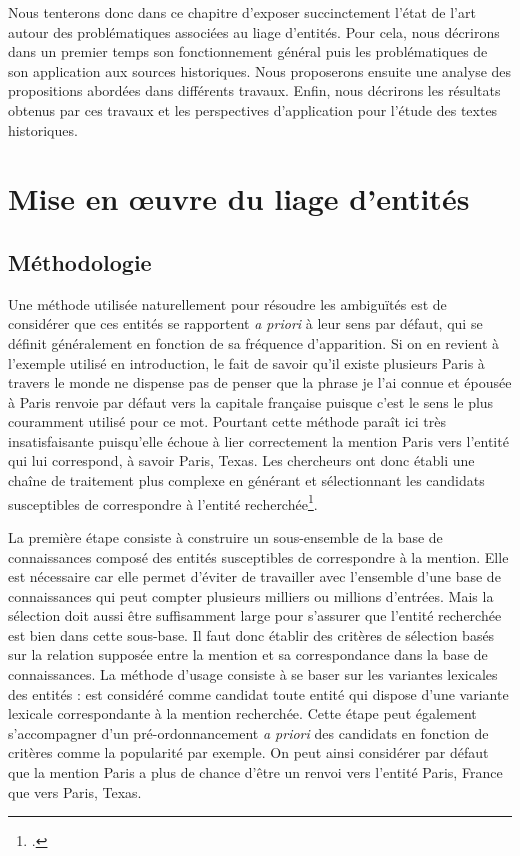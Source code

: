 \documentclass[a4paper,12pt,twoside]{book}
\begin{document}
	Nous tenterons donc dans ce chapitre d'exposer succinctement l'état de l'art autour des  problématiques associées au liage d'entités. Pour cela, nous décrirons dans un premier temps son fonctionnement général puis les problématiques de son application aux sources historiques. Nous proposerons ensuite une analyse des propositions abordées dans différents travaux. Enfin, nous décrirons les résultats obtenus par ces travaux et les perspectives d'application pour l'étude des textes historiques.
	
	
	\section{Mise en œuvre du liage d'entités}
	
	\subsection{Méthodologie}
	
	Une méthode utilisée naturellement pour résoudre les ambiguïtés est de considérer que ces entités se rapportent \textit{a priori} à leur sens par défaut, qui se définit généralement en fonction de sa fréquence d'apparition. Si on en revient à l'exemple utilisé en introduction, le fait de savoir qu'il existe plusieurs \og Paris\fg{} à travers le monde ne dispense pas de penser que la phrase \og je l’ai connue et épousée à Paris\fg{} renvoie par défaut vers la capitale française puisque c'est le sens le plus couramment utilisé pour ce mot. Pourtant cette méthode paraît ici très insatisfaisante puisqu'elle échoue à lier correctement la mention \og Paris\fg{} vers l'entité qui lui correspond, à savoir \og Paris, Texas\fg{}. Les chercheurs ont donc établi une chaîne de traitement plus complexe en générant et sélectionnant les candidats susceptibles de correspondre à l'entité recherchée\footcite[p. 117--125]{stern_identification_2013}.
	
	La première étape consiste à construire un sous-ensemble de la base de connaissances composé des entités susceptibles de correspondre à la mention. Elle est nécessaire car elle permet d'éviter de travailler avec l'ensemble d'une base de connaissances qui peut compter plusieurs milliers ou millions d'entrées. Mais la sélection doit aussi être suffisamment large pour s'assurer que l'entité recherchée est bien dans cette sous-base. Il faut donc établir des critères de sélection basés sur la relation supposée entre la mention et sa correspondance dans la base de connaissances. La méthode d'usage consiste à se baser sur les variantes lexicales des entités : est considéré comme candidat toute entité qui dispose d'une variante lexicale correspondante à la mention recherchée. Cette étape peut également s'accompagner d'un pré-ordonnancement \textit{a priori} des candidats en fonction de critères comme la popularité par exemple. On peut ainsi considérer par défaut que la mention \og Paris\fg{} a plus de chance d'être un renvoi vers l'entité \og Paris, France\fg{} que vers \og Paris, Texas\fg{}.
	
\end{document}
